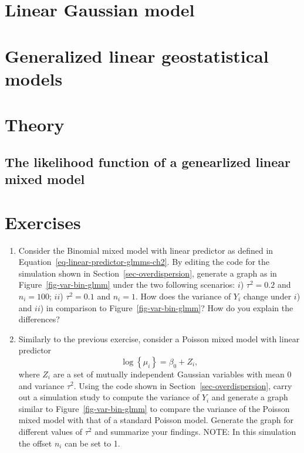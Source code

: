 \documentclass[
  letterpaper,
]{krantz}
\begin{document}
\hypertarget{linear-gaussian-model}{%
\section{Linear Gaussian model}\label{linear-gaussian-model}}

\hypertarget{generalized-linear-geostatistical-models}{%
\section{Generalized linear geostatistical
models}\label{generalized-linear-geostatistical-models}}

\hypertarget{theory}{%
\section{Theory}\label{theory}}

\hypertarget{the-likelihood-function-of-a-genearlized-linear-mixed-model}{%
\subsection{The likelihood function of a genearlized linear mixed
model}\label{the-likelihood-function-of-a-genearlized-linear-mixed-model}}

\hypertarget{exercises}{%
\section{Exercises}\label{exercises}}

\begin{enumerate}
\def\labelenumi{\arabic{enumi}.}
\setcounter{enumi}{1}
\item
  Consider the Binomial mixed model with linear predictor as defined in
  Equation~\ref{eq-linear-predictor-glmms-ch2}. By editing the code for
  the simulation shown in Section~\ref{sec-overdispersion}, generate a
  graph as in Figure~\ref{fig-var-bin-glmm} under the two following
  scenarios: \(i\)) \(\tau^2 = 0.2\) and \(n_i=100\); \(ii\))
  \(\tau^2 = 0.1\) and \(n_i = 1\). How does the variance of \(Y_i\)
  change under \(i\)) and \(ii\)) in comparison to
  Figure~\ref{fig-var-bin-glmm}? How do you explain the differences?
\item
  Similarly to the previous exercise, consider a Poisson mixed model
  with linear predictor \[
  \log\left\{\mu_i\right\} = \beta_0 + Z_i,
  \] where \(Z_i\) are a set of mutually independent Gaussian variables
  with mean 0 and variance \(\tau^2\). Using the code shown in
  Section~\ref{sec-overdispersion}, carry out a simulation study to
  compute the variance of \(Y_i\) and generate a graph similar to
  Figure~\ref{fig-var-bin-glmm} to compare the variance of the Poisson
  mixed model with that of a standard Poisson model. Generate the graph
  for different values of \(\tau^2\) and summarize your findings. NOTE:
  In this simulation the offset \(n_i\) can be set to 1.
\end{enumerate}
\end{document}
